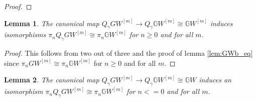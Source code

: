 \documentclass[edeposit,fullpage]{uiucthesis2009}
\newcommand{\mbb}{\mathbb}
\theoremstyle{plain}
\newtheorem{lemma}{Lemma}
\numberwithin{lemma}{section}
\theoremstyle{definition}
\begin{document}
\begin{proof}

\end{proof}



\begin{lemma}\label{lem:pos_htpy}
The canonical map $Q_\gamma GW^{[m]} \rightarrow Q_\gamma \mbb GW^{[m]} \cong \mbb
GW^{[m]}$ induces isomorphisms $\pi_nQ_\gamma GW^{[m]} \cong \pi_n \mbb
GW^{[m]}$ for $n \geq 0$ and for all $m$.
\end{lemma}

\begin{proof}
This follows from two out of three and the proof of lemma \ref{lem:GWb_eq} since $\pi_nGW^{[m]} \cong \pi_n \mbb GW^{[m]}$
for $n \geq 0$ and for all $m$. 
\end{proof}


\begin{lemma}\label{lem:neg_htpy}
The canonical map $Q_\gamma GW^{[m]} \rightarrow Q_\gamma \mbb GW^{[m]} \cong \mbb
GW$ induces an isomorphism $\pi_n Q_\gamma GW^{[m]} \cong \pi_n \mbb
GW^{[m]}$ for $n <= 0$ and for all $m$.
\end{lemma}
\end{document}
